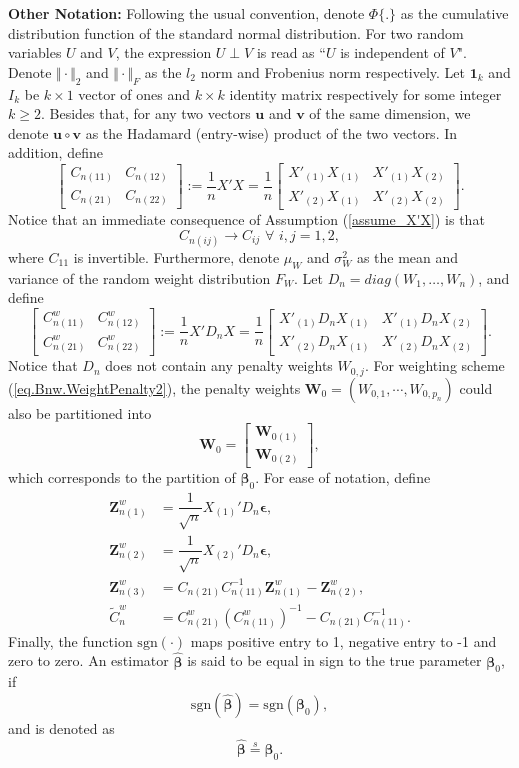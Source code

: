 \documentclass[ejs,authoryear,linksfromyear]{imsart}
\newcommand{\cnwa}{C_{n(11)}^w}
\newcommand{\cnwb}{C_{n(12)}^w}
\newcommand{\cnwc}{C_{n(21)}^w}
\newcommand{\cnwd}{C_{n(22)}^w}
\newcommand{\znwa}{\bm{Z}_{n(1)}^w}
\newcommand{\znwb}{\bm{Z}_{n(2)}^w}
\newcommand{\znwc}{\bm{Z}_{n(3)}^w}
\numberwithin{equation}{section}
\theoremstyle{plain}
\begin{document}
\noindent
\textbf{Other Notation:} Following the usual convention, denote $\Phi \{.\}$ as the cumulative distribution function of the standard normal distribution. For two random variables $U$ and $V$, the expression $U \perp V$ is read as ``$U$ is independent of $V$". Denote $\Vert \cdot \Vert_2$ and $\Vert \cdot \Vert_F$ as the $l_2$ norm and Frobenius norm respectively. Let $\bm{1}_k$ and $I_k$ be $k \times 1$ vector of ones and $k \times k$ identity matrix respectively for some integer $k \geq 2$. Besides that, for any two vectors $\bm{u}$ and $\bm{v}$ of the same dimension, we denote $\bm{u} \circ \bm{v}$ as the Hadamard (entry-wise) product of the two vectors. In addition, define 
\[
\begin{bmatrix}
C_{n(11)} & C_{n(12)} \\
C_{n(21)} & C_{n(22)} 
\end{bmatrix}
:= \dfrac{1}{n} X'X = \dfrac{1}{n}
\begin{bmatrix}
X'_{(1)} X_{(1)} & X'_{(1)} X_{(2)} \\
X'_{(2)} X_{(1)} & X'_{(2)} X_{(2)}
\end{bmatrix}
.
\]
Notice that an immediate consequence of Assumption (\ref{assume_X'X}) is that 
$$
C_{n(ij)} \to C_{ij} \,\, \forall \,\, i,j = 1,2,
$$
where $C_{11}$ is invertible. Furthermore, denote $\mu_W$ and $\sigma^2_W$ as the mean and variance of the random weight distribution $F_W$. Let $D_n = diag(W_1, \ldots, W_n)$, and define 
\[
\begin{bmatrix}
\cnwa & \cnwb \\
\cnwc & \cnwd 
\end{bmatrix}
:= \dfrac{1}{n} X' D_n X = \dfrac{1}{n}
\begin{bmatrix}
X'_{(1)} D_n X_{(1)} & X'_{(1)} D_n X_{(2)} \\
X'_{(2)} D_n X_{(1)} & X'_{(2)} D_n X_{(2)}
\end{bmatrix}
.
\]
Notice that $D_n$ does not contain any penalty weights $W_{0,j}$. For weighting scheme (\ref{eq.Bnw.WeightPenalty2}), the penalty weights $\bm{W}_0 = (W_{0,1}, \cdots, W_{0,p_n})$ could also be partitioned into
\[
\bm{W}_0 = 
\begin{bmatrix}
\bm{W}_{0(1)} \\
\bm{W}_{0(2)}
\end{bmatrix}
,
\]
which corresponds to the partition of $\bm{\beta}_0$. For ease of notation, define
\begin{align*}
\znwa &= \dfrac{1}{\sqrt{n}} X_{(1)}' D_n \bm{\epsilon}, \\
\znwb &= \dfrac{1}{\sqrt{n}} X_{(2)}' D_n \bm{\epsilon}, \\
\znwc &= C_{n(21)} C_{n(11)}^{-1} \znwa - \znwb, \\
\widetilde{C}^w_n &= \cnwc \left( \cnwa \right)^{-1} - C_{n(21)} C_{n(11)}^{-1}.
\end{align*}
Finally, the function $\text{sgn}(\cdot)$ maps positive entry to 1, negative entry to -1 and zero to zero. An estimator $\widehat{\bm{\beta}}$ is said to be equal in sign to the true parameter $\bm{\beta}_0$, if 
$$
\text{sgn}(\widehat{\bm{\beta}}) = \text{sgn}(\bm{\beta}_0),
$$
and is denoted as
$$
\widehat{\bm{\beta}} \stackrel{s}{=} \bm{\beta}_0.
$$	
\end{document}
